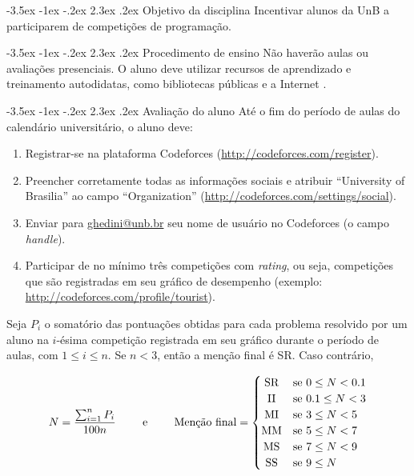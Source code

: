 \documentclass{UnBExam}%
\makeatletter
\renewcommand\section{\@startsection{section}{1}{\z@}%
	{-3.5ex \@plus -1ex \@minus -.2ex}%
	{2.3ex \@plus.2ex}%
	{\normalfont\normalsize\bfseries}}%
\renewcommand{\indent}{\hspace{.5cm}}
\makeatother
\begin{document}
	
\section{Objetivo da disciplina}
\indent Incentivar alunos da UnB a participarem de competições de programação.

\section{Procedimento de ensino}
\indent Não haverão aulas ou avaliações presenciais. O aluno deve utilizar recursos de aprendizado e treinamento autodidatas, como bibliotecas públicas e a Internet \cite{halim2013competitive,cormen2009introduction,pimentaarticle}.

\section{Avaliação do aluno}
\indent Até o fim do período de aulas do calendário universitário, o aluno deve:
\begin{enumerate}
	\item Registrar-se na plataforma Codeforces (\url{http://codeforces.com/register}).
	\item Preencher corretamente todas as informações sociais e atribuir ``University of Brasilia'' ao campo ``Organization'' (\url{http://codeforces.com/settings/social}).
	\item Enviar para \url{ghedini@unb.br} seu nome de usuário no Codeforces (o campo \textit{handle}).
	\item Participar de no mínimo três competições com \textit{rating}, ou seja, competições que são registradas em seu gráfico de desempenho (exemplo: \url{http://codeforces.com/profile/tourist}).
\end{enumerate}
\indent Seja $P_i$ o somatório das pontuações obtidas para cada problema resolvido por um aluno na $i$-ésima competição registrada em seu gráfico durante o período de aulas, com $1 \leq i \leq n$. Se $n < 3$, então a menção final é SR. Caso contrário,

\vspace{-.7cm}
\[
\begin{array}{ccc}
	N = \dfrac{\sum_{i=1}^{n} P_i}{100n} & \;\;\;\;\; \text{e} \;\;\;\;\; & 
	\text{Menção final} =
	\begin{cases}
	\hfill \text{SR} \hfill & \text{se } 0 \leq N < 0.1 \\
	\hfill \text{II} \hfill & \text{se } 0.1 \leq N < 3 \\
	\hfill \text{MI} \hfill & \text{se } 3 \leq N < 5 \\
	\hfill \text{MM} \hfill & \text{se } 5 \leq N < 7 \\
	\hfill \text{MS} \hfill & \text{se } 7 \leq N < 9 \\
	\hfill \text{SS} \hfill & \text{se } 9 \leq N \\
	\end{cases}
\end{array}
\]
\end{document}
